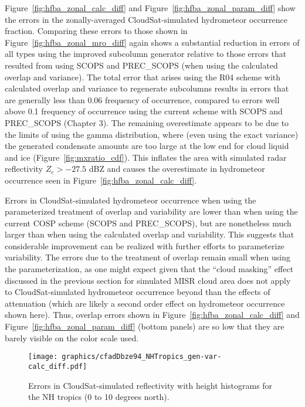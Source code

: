 Figure~\ref{fig:hfba_zonal_calc_diff} and
Figure~\ref{fig:hfba_zonal_param_diff} show the errors in the
zonally-averaged CloudSat-simulated hydrometeor occurrence fraction.
Comparing these errors to those shown in
Figure~\ref{fig:hfba_zonal_mro_diff} again shows a substantial reduction
in errors of all types using the improved subcolumn generator relative
to those errors that resulted from using SCOPS and PREC\_SCOPS (when
using the calculated overlap and variance). The total error that arises
using the R04 scheme with calculated overlap and variance to regenerate
subcolumns results in errors that are generally less than 0.06 frequency
of occurrence, compared to errors well above 0.1 frequency of occurrence
using the current scheme with SCOPS and PREC\_SCOPS (Chapter 3). The
remaining overestimate appears to be due to the limits of using the
gamma distribution, where (even using the exact variance) the generated
condensate amounts are too large at the low end for cloud liquid and ice
(Figure~\ref{fig:mxratio_cdf}). This inflates the area with simulated
radar reflectivity \(Z_e > -27.5\) dBZ and causes the overestimate in
hydrometeor occurrence seen in Figure~\ref{fig:hfba_zonal_calc_diff}.

Errors in CloudSat-simulated hydrometeor occurrence when using the
parameterized treatment of overlap and variability are lower than when
using the current COSP scheme (SCOPS and PREC\_SCOPS), but are
nonetheless much larger than when using the calculated overlap and
variability. This suggests that considerable improvement can be realized
with further efforts to parameterize variability. The errors due to the
treatment of overlap remain small when using the parameterization, as
one might expect given that the ``cloud masking'' effect discussed in
the previous section for simulated MISR cloud area does not apply to
CloudSat-simulated hydrometeor occurrence beyond than the effects of
attenuation (which are likely a second order effect on hydrometeor
occurrence shown here). Thus, overlap errors shown in
Figure~\ref{fig:hfba_zonal_calc_diff} and
Figure~\ref{fig:hfba_zonal_param_diff} (bottom panels) are so low that
they are barely visible on the color scale used.

\begin{figure}[tp]
\centering
\texttt{[image: graphics/cfadDbze94\_NHTropics\_gen-var-calc\_diff.pdf]}
\caption{\label{fig:cfad_NHTropics_calc_diff}Errors in
CloudSat-simulated reflectivity with height histograms for the NH
tropics (0 to 10 degrees
north).}\label{fig:cfadux5fNHTropicsux5fcalcux5fdiff}
\end{figure}

